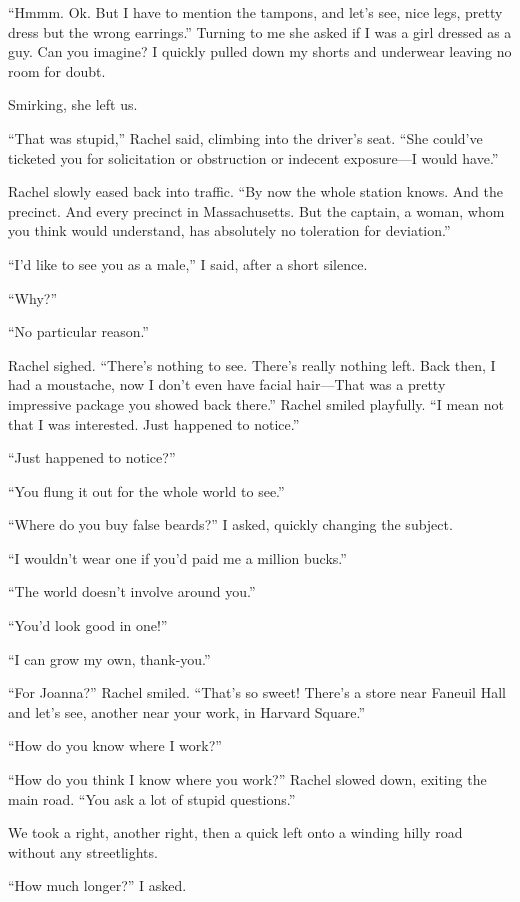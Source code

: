 ``Hmmm. Ok. But I have to mention the tampons, and let's see, nice legs,
pretty dress but the wrong earrings.'' Turning to me she asked if I was
a girl dressed as a guy. Can you imagine? I quickly pulled down my
shorts and underwear leaving no room for doubt.

Smirking, she left us.

``That was stupid,'' Rachel said, climbing into the driver's seat. ``She
could've ticketed you for solicitation or obstruction or indecent
exposure---I would have.''

Rachel slowly eased back into traffic. ``By now the whole station knows.
And the precinct. And every precinct in Massachusetts. But the captain,
a woman, whom you think would understand, has absolutely no toleration
for deviation.''

``I'd like to see you as a male,'' I said, after a short silence.

``Why?''

``No particular reason.''

Rachel sighed. ``There's nothing to see. There's really nothing left.
Back then, I had a moustache, now I don't even have facial hair---That
was a pretty impressive package you showed back there.'' Rachel smiled
playfully. ``I mean not that I was interested. Just happened to
notice.''

``Just happened to notice?''

``You flung it out for the whole world to see.''

``Where do you buy false beards?'' I asked, quickly changing the
subject.

``I wouldn't wear one if you'd paid me a million bucks.''

``The world doesn't involve around you.''

``You'd look good in one!''

``I can grow my own, thank-you.''

``For Joanna?'' Rachel smiled. ``That's so sweet! There's a store near
Faneuil Hall and let's see, another near your work, in Harvard Square.''

``How do you know where I work?''

``How do you think I know where you work?'' Rachel slowed down, exiting
the main road. ``You ask a lot of stupid questions.''

We took a right, another right, then a quick left onto a winding hilly
road without any streetlights.

``How much longer?'' I asked.

